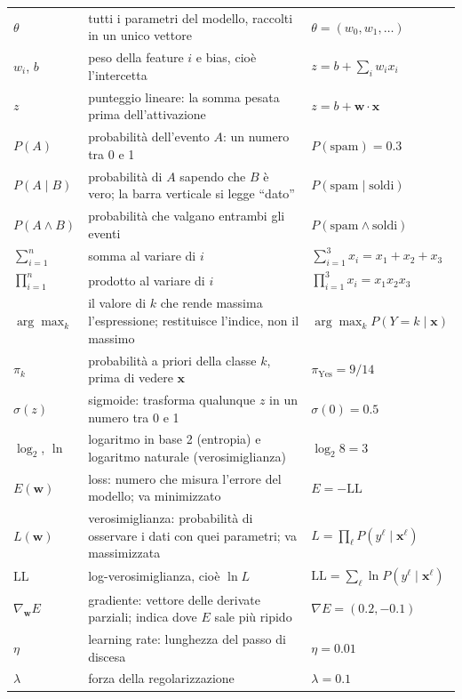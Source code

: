 \documentclass[12pt]{extarticle}
\begin{document}
\begin{longtable}[c]{@{}L{2.4cm}L{8.2cm}L{5.4cm}@{}}
$\theta$ & tutti i parametri del modello, raccolti in un unico vettore & $\theta=(w_0,w_1,\dots)$ \\
$w_i$, $b$ & peso della feature $i$ e bias, cioè l'intercetta & $z=b+\sum_i w_i x_i$ \\
$z$ & punteggio lineare: la somma pesata prima dell'attivazione & $z=b+\mathbf{w}\cdot\mathbf{x}$ \\
\addlinespace[6pt]
\midrule
\addlinespace[2pt]
$P(A)$ & probabilità dell'evento $A$: un numero tra 0 e 1 & $P(\text{spam})=0.3$ \\
$P(A\mid B)$ & probabilità di $A$ sapendo che $B$ è vero; la barra verticale si legge ``dato'' & $P(\text{spam}\mid\text{soldi})$ \\
$P(A\land B)$ & probabilità che valgano entrambi gli eventi & $P(\text{spam}\land\text{soldi})$ \\
$\sum_{i=1}^{n}$ & somma al variare di $i$ & $\sum_{i=1}^{3}x_i=x_1+x_2+x_3$ \\
$\prod_{i=1}^{n}$ & prodotto al variare di $i$ & $\prod_{i=1}^{3}x_i=x_1x_2x_3$ \\
$\arg\max_k$ & il valore di $k$ che rende massima l'espressione; restituisce l'indice, non il massimo & $\arg\max_k P(Y=k\mid\mathbf{x})$ \\
$\pi_k$ & probabilità a priori della classe $k$, prima di vedere $\mathbf{x}$ & $\pi_{\text{Yes}}=9/14$ \\
$\sigma(z)$ & sigmoide: trasforma qualunque $z$ in un numero tra 0 e 1 & $\sigma(0)=0.5$ \\
$\log_2$, $\ln$ & logaritmo in base 2 (entropia) e logaritmo naturale (verosimiglianza) & $\log_2 8=3$ \\
\addlinespace[6pt]
\midrule
\addlinespace[2pt]
$E(\mathbf{w})$ & loss: numero che misura l'errore del modello; va minimizzato & $E=-\mathrm{LL}$ \\
$L(\mathbf{w})$ & verosimiglianza: probabilità di osservare i dati con quei parametri; va massimizzata & $L=\prod_\ell P(y^\ell\mid\mathbf{x}^\ell)$ \\
$\mathrm{LL}$ & log-verosimiglianza, cioè $\ln L$ & $\mathrm{LL}=\sum_\ell \ln P(y^\ell\mid\mathbf{x}^\ell)$ \\
$\nabla_{\mathbf{w}}E$ & gradiente: vettore delle derivate parziali; indica dove $E$ sale più ripido & $\nabla E=(0.2,-0.1)$ \\
$\eta$ & learning rate: lunghezza del passo di discesa & $\eta=0.01$ \\
$\lambda$ & forza della regolarizzazione & $\lambda=0.1$ \\

\end{longtable}
\end{document}
